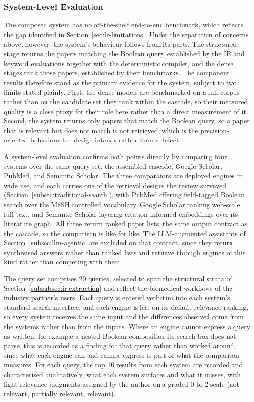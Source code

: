 \subsubsection{System-Level Evaluation}
\label{subsubsec:system-level}

The composed system has no off-the-shelf end-to-end benchmark, which reflects the gap identified in Section~\ref{sec:lr-limitations}. Under the separation of concerns above, however, the system's behaviour follows from its parts. The structured stage returns the papers matching the Boolean query, established by the IR and keyword evaluations together with the deterministic compiler, and the dense stages rank those papers, established by their benchmarks. The component results therefore stand as the primary evidence for the system, subject to two limits stated plainly. First, the dense models are benchmarked on a full corpus rather than on the candidate set they rank within the cascade, so their measured quality is a close proxy for their role here rather than a direct measurement of it. Second, the system returns only papers that match the Boolean query, so a paper that is relevant but does not match is not retrieved, which is the precision-oriented behaviour the design intends rather than a defect.

A system-level evaluation confirms both points directly by comparing four systems over the same query set: the assembled cascade, Google Scholar, PubMed, and Semantic Scholar. The three comparators are deployed engines in wide use, and each carries one of the retrieval designs the review surveyed (Section~\ref{subsec:traditional-search}), with PubMed offering field-tagged Boolean search over the MeSH controlled vocabulary, Google Scholar ranking web-scale full text, and Semantic Scholar layering citation-informed embeddings over its literature graph. All three return ranked paper lists, the same output contract as the cascade, so the comparison is like for like. The LLM-augmented assistants of Section~\ref{subsec:llm-agentic} are excluded on that contract, since they return synthesised answers rather than ranked lists and retrieve through engines of this kind rather than competing with them.

The query set comprises 20 queries, selected to span the structural strata of Section~\ref{subsubsec:ir-extraction} and reflect the biomedical workflows of the industry partner's users. Each query is entered verbatim into each system's standard search interface, and each engine is left on its default relevance ranking, so every system receives the same input and the differences observed come from the systems rather than from the inputs. Where an engine cannot express a query as written, for example a nested Boolean composition its search box does not parse, this is recorded as a finding for that query rather than worked around, since what each engine can and cannot express is part of what the comparison measures. For each query, the top 10 results from each system are recorded and characterised qualitatively, what each system surfaces and what it misses, with light relevance judgments assigned by the author on a graded 0 to 2 scale (not relevant, partially relevant, relevant).

